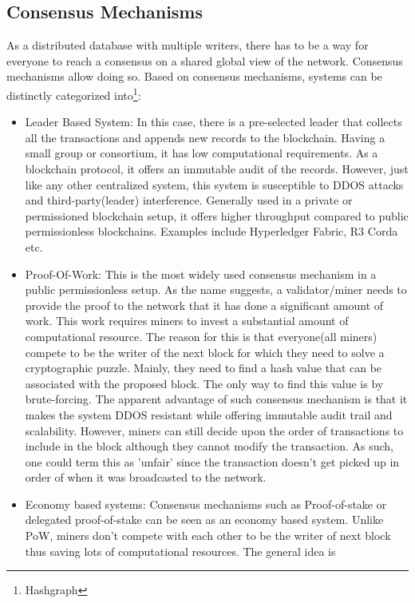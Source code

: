 \subsection{Consensus Mechanisms}
As a distributed database with multiple writers, there has to be a way for
everyone to reach a consensus on a shared global view of the network. Consensus
mechanisms allow doing so. Based on consensus mechanisms, systems can be
distinctly categorized into\footnote{Hashgraph}:
\begin{itemize}
	\item Leader Based System: In this case, there is a pre-selected leader
		that collects all the transactions and appends new records to the
		blockchain.  Having a small group or consortium, it has low
		computational requirements. As a blockchain protocol, it offers an
		immutable audit of the records. However, just like any other
		centralized system, this system is susceptible to DDOS attacks and
		third-party(leader) interference. Generally used in a private or
		permissioned blockchain setup, it offers higher throughput compared to
		public permissionless blockchains. Examples include Hyperledger Fabric,
		R3 Corda etc. 
	\item Proof-Of-Work: This is the most widely used consensus mechanism in a
		public permissionless setup. As the name suggests, a validator/miner
		needs to provide the proof to the network that it has done a
		significant amount of work. This work requires miners to invest a
		substantial amount of computational resource. The reason for this is
		that everyone(all miners) compete to be the writer of the next block
		for which they need to solve a cryptographic puzzle. Mainly, they need
		to find a hash value that can be associated with the proposed block.
		The only way to find this value is by brute-forcing. The apparent
		advantage of such consensus mechanism is that it makes the system DDOS
		resistant while offering immutable audit trail and scalability.
		However, miners can still decide upon the order of transactions to
		include in the block although they cannot modify the transaction. As
		such, one could term this as 'unfair' since the transaction doesn't get
		picked up in order of when it was broadcasted to the network. 
	\item Economy based systems: Consensus mechanisms such as Proof-of-stake or
		delegated proof-of-stake can be seen as an economy based system. Unlike
		PoW, miners don't compete with each other to be the writer of next
		block thus saving lots of computational resources. The general idea is

\end{itemize}
